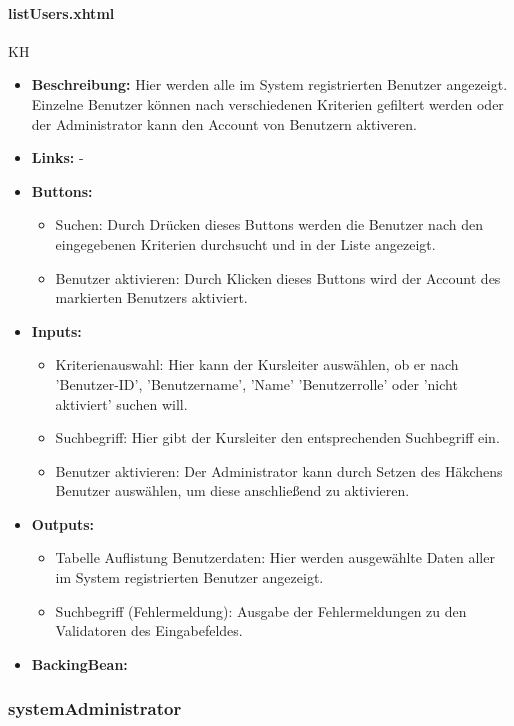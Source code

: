 				\paragraph{listUsers.xhtml}
					KH\\
					\begin{itemize}
						\item \textbf{Beschreibung:} Hier werden alle im System registrierten Benutzer angezeigt. Einzelne Benutzer können nach verschiedenen Kriterien gefiltert werden oder der Administrator kann den Account von Benutzern aktiveren. 
						\item \textbf{Links:} -
						\item \textbf{Buttons:}
							\begin{itemize}
								\item Suchen: Durch Drücken dieses Buttons werden die Benutzer nach den eingegebenen Kriterien durchsucht und in der Liste angezeigt.
								\item Benutzer aktivieren: Durch Klicken dieses Buttons wird der Account des markierten Benutzers aktiviert.
							\end{itemize}
						\item \textbf{Inputs:}
							\begin{itemize}
								\item Kriterienauswahl: Hier kann der Kursleiter auswählen, ob er nach 'Benutzer-ID', 'Benutzername', 'Name' 'Benutzerrolle' oder 'nicht aktiviert' suchen will.
								\item Suchbegriff: Hier gibt der Kursleiter den entsprechenden Suchbegriff ein.
								\item Benutzer aktivieren: Der Administrator kann durch Setzen des Häkchens Benutzer auswählen, um diese anschließend zu aktivieren.
							\end{itemize}
						\item \textbf{Outputs:}
							\begin{itemize}
								\item Tabelle Auflistung Benutzerdaten: Hier werden ausgewählte Daten aller im System registrierten Benutzer angezeigt.
								\item Suchbegriff (Fehlermeldung): Ausgabe der Fehlermeldungen zu den Validatoren des Eingabefeldes.
							\end{itemize}
						\item \textbf{BackingBean:}
					\end{itemize}
			
			\subsubsection{systemAdministrator}
			
